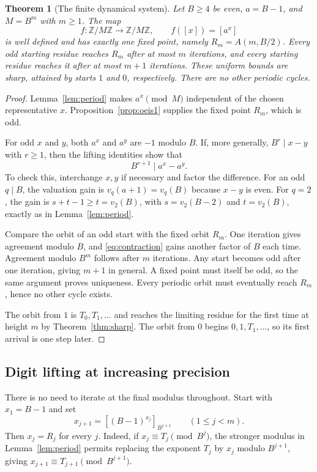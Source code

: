 \documentclass[11pt,letterpaper]{article}
\numberwithin{equation}{section}
\newtheorem{theorem}{Theorem}[section]
\theoremstyle{definition}
\theoremstyle{remark}
\newcommand{\Z}{\mathbb Z}
\newcommand{\res}[2]{\left[#1\right]_{#2}}
\begin{document}
\begin{theorem}[The finite dynamical system]\label{thm:dynamics}
Let $B\ge4$ be even, $a=B-1$, and $M=B^m$ with $m\ge1$. The map
\[
 f:\Z/M\Z\longrightarrow\Z/M\Z,\qquad f([x])=[a^x]
\]
is well defined and has exactly one fixed point, namely $R_m=A(m,B/2)$. Every odd starting residue reaches $R_m$ after at most $m$ iterations, and every starting residue reaches it after at most $m+1$ iterations. These uniform bounds are sharp, attained by starts $1$ and $0$, respectively. There are no other periodic cycles.
\end{theorem}
\begin{proof}
Lemma~\ref{lem:period} makes $a^x\pmod M$ independent of the chosen representative $x$. Proposition~\ref{prop:oeis1} supplies the fixed point $R_m$, which is odd.

For odd $x$ and $y$, both $a^x$ and $a^y$ are $-1$ modulo $B$. If, more generally, $B^r\mid x-y$ with $r\ge1$, then the lifting identities show that
\begin{equation}\label{eq:contraction}
 B^{r+1}\mid a^x-a^y.
\end{equation}
To check this, interchange $x,y$ if necessary and factor the difference. For an odd $q\mid B$, the valuation gain is $v_q(a+1)=v_q(B)$ because $x-y$ is even. For $q=2$, the gain is $s+t-1\ge t=v_2(B)$, with $s=v_2(B-2)$ and $t=v_2(B)$, exactly as in Lemma~\ref{lem:period}.

Compare the orbit of an odd start with the fixed orbit $R_m$. One iteration gives agreement modulo $B$, and \eqref{eq:contraction} gains another factor of $B$ each time. Agreement modulo $B^m$ follows after $m$ iterations. Any start becomes odd after one iteration, giving $m+1$ in general. A fixed point must itself be odd, so the same argument proves uniqueness. Every periodic orbit must eventually reach $R_m$, hence no other cycle exists.

The orbit from $1$ is $T_0,T_1,\ldots$ and reaches the limiting residue for the first time at height $m$ by Theorem~\ref{thm:sharp}. The orbit from $0$ begins $0,1,T_1,\ldots$, so its first arrival is one step later.
\end{proof}

\subsection{Digit lifting at increasing precision}

There is no need to iterate at the final modulus throughout. Start with $x_1=B-1$ and set
\begin{equation}\label{eq:lift}
 x_{j+1}=\res{(B-1)^{x_j}}{B^{j+1}}\qquad(1\le j<m).
\end{equation}
Then $x_j=R_j$ for every $j$. Indeed, if $x_j\equiv T_j\pmod{B^j}$, the stronger modulus in Lemma~\ref{lem:period} permits replacing the exponent $T_j$ by $x_j$ modulo $B^{j+1}$, giving $x_{j+1}\equiv T_{j+1}\pmod{B^{j+1}}$.
\end{document}
